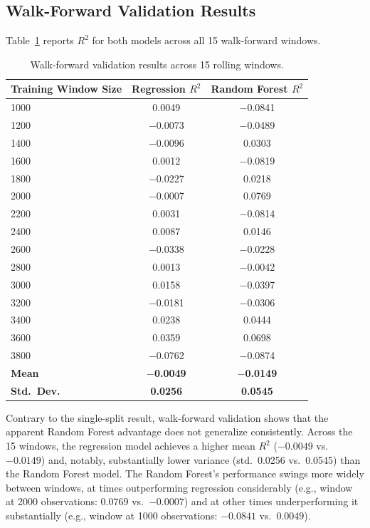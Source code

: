 \documentclass[11pt]{article}
\begin{document}
\subsection{Walk-Forward Validation Results}

Table~\ref{tab:walkforward} reports $R^2$ for both models across all 15 walk-forward windows.

\begin{table}[h]
\centering
\begin{tabular}{lcc}
\toprule
Training Window Size & Regression $R^2$ & Random Forest $R^2$ \\
\midrule
1000 & 0.0049 & $-$0.0841 \\
1200 & $-$0.0073 & $-$0.0489 \\
1400 & $-$0.0096 & 0.0303 \\
1600 & 0.0012 & $-$0.0819 \\
1800 & $-$0.0227 & 0.0218 \\
2000 & $-$0.0007 & 0.0769 \\
2200 & 0.0031 & $-$0.0814 \\
2400 & 0.0087 & 0.0146 \\
2600 & $-$0.0338 & $-$0.0228 \\
2800 & 0.0013 & $-$0.0042 \\
3000 & 0.0158 & $-$0.0397 \\
3200 & $-$0.0181 & $-$0.0306 \\
3400 & 0.0238 & 0.0444 \\
3600 & 0.0359 & 0.0698 \\
3800 & $-$0.0762 & $-$0.0874 \\
\midrule
\textbf{Mean} & \textbf{$-$0.0049} & \textbf{$-$0.0149} \\
\textbf{Std.\ Dev.} & \textbf{0.0256} & \textbf{0.0545} \\
\bottomrule
\end{tabular}
\caption{Walk-forward validation results across 15 rolling windows.}
\label{tab:walkforward}
\end{table}

Contrary to the single-split result, walk-forward validation shows that the apparent Random Forest advantage does not generalize consistently. Across the 15 windows, the regression model achieves a higher mean $R^2$ ($-0.0049$ vs.\ $-0.0149$) and, notably, substantially lower variance (std.\ 0.0256 vs.\ 0.0545) than the Random Forest model. The Random Forest's performance swings more widely between windows, at times outperforming regression considerably (e.g., window at 2000 observations: $0.0769$ vs.\ $-0.0007$) and at other times underperforming it substantially (e.g., window at 1000 observations: $-0.0841$ vs.\ $0.0049$).
\end{document}
